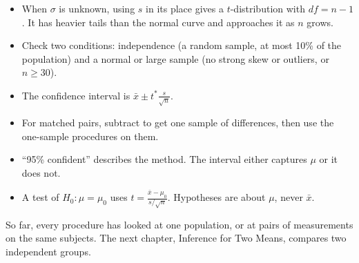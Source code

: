 \begin{mdframed}[style=important, frametitle={Key Ideas}]
\begin{itemize}
\item When $\sigma$ is unknown, using $s$ in its place gives a $t$-distribution with $df = n - 1$. It has heavier tails than the normal curve and approaches it as $n$ grows.
\item Check two conditions: independence (a random sample, at most 10\% of the population) and a normal or large sample (no strong skew or outliers, or $n \geq 30$).
\item The confidence interval is $\bar{x} \pm t^*\frac{s}{\sqrt{n}}$.
\item For matched pairs, subtract to get one sample of differences, then use the one-sample procedures on them.
\item ``95\% confident'' describes the method. The interval either captures $\mu$ or it does not.
\item A test of $H_0: \mu = \mu_0$ uses $t = \frac{\bar{x} - \mu_0}{s/\sqrt{n}}$. Hypotheses are about $\mu$, never $\bar{x}$.
\end{itemize}
\end{mdframed}

So far, every procedure has looked at one population, or at pairs of measurements on the same subjects. The
next chapter, Inference for Two Means, compares two independent groups.
